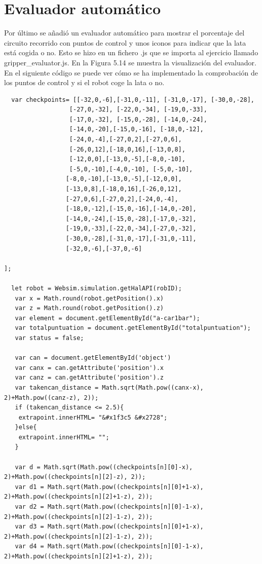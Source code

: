 \section{Evaluador automático}

Por último se añadió un evaluador automático para mostrar el porcentaje del circuito recorrido con puntos de control y unos iconos para indicar que la lata está cogida o no. Esto se hizo en un fichero .js que se importa al ejercicio llamado gripper\_evaluator.js. En la Figura 5.14 se muestra la visualización del evaluador. En el siguiente código se puede ver cómo se ha implementado la comprobación de los puntos de control y si el robot coge la lata o no.


\begin{lstlisting}
  var checkpoints= [[-32,0,-6],[-31,0,-11], [-31,0,-17], [-30,0,-28],
                  [-27,0,-32], [-22,0,-34], [-19,0,-33],
                  [-17,0,-32], [-15,0,-28], [-14,0,-24],
                  [-14,0,-20],[-15,0,-16], [-18,0,-12],
                  [-24,0,-4],[-27,0,2],[-27,0,6],
                  [-26,0,12],[-18,0,16],[-13,0,8],
                  [-12,0,0],[-13,0,-5],[-8,0,-10],
                  [-5,0,-10],[-4,0,-10], [-5,0,-10],
		         [-8,0,-10],[-13,0,-5],[-12,0,0],
		         [-13,0,8],[-18,0,16],[-26,0,12],
		         [-27,0,6],[-27,0,2],[-24,0,-4],
		         [-18,0,-12],[-15,0,-16],[-14,0,-20],
		         [-14,0,-24],[-15,0,-28],[-17,0,-32],
		         [-19,0,-33],[-22,0,-34],[-27,0,-32], 
		         [-30,0,-28],[-31,0,-17],[-31,0,-11],
   		         [-32,0,-6],[-37,0,-6]
		 
];

  let robot = Websim.simulation.getHalAPI(robID);
   var x = Math.round(robot.getPosition().x)
   var z = Math.round(robot.getPosition().z)
   var element = document.getElementById("a-car1bar");
   var totalpuntuation = document.getElementById("totalpuntuation");
   var status = false;

   var can = document.getElementById('object')
   var canx = can.getAttribute('position').x
   var canz = can.getAttribute('position').z
   var takencan_distance = Math.sqrt(Math.pow((canx-x), 2)+Math.pow((canz-z), 2));
   if (takencan_distance <= 2.5){
    extrapoint.innerHTML= "&#x1f3c5 &#x2728";
   }else{
    extrapoint.innerHTML= "";
   }
   
   var d = Math.sqrt(Math.pow((checkpoints[n][0]-x), 2)+Math.pow((checkpoints[n][2]-z), 2));
   var d1 = Math.sqrt(Math.pow((checkpoints[n][0]+1-x), 2)+Math.pow((checkpoints[n][2]+1-z), 2));
   var d2 = Math.sqrt(Math.pow((checkpoints[n][0]-1-x), 2)+Math.pow((checkpoints[n][2]-1-z), 2));
   var d3 = Math.sqrt(Math.pow((checkpoints[n][0]+1-x), 2)+Math.pow((checkpoints[n][2]-1-z), 2));
   var d4 = Math.sqrt(Math.pow((checkpoints[n][0]-1-x), 2)+Math.pow((checkpoints[n][2]+1-z), 2));
	

\end{lstlisting}
